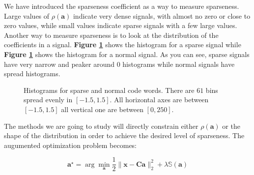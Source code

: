 \documentclass[12pt,a4paper,oneside,english]{UPBThesis}
\begin{document}
We have introduced the sparseness coefficient as a way to measure sparseness. Large values of $\rho(\textbf{a})$ indicate very dense signals, with almost no zero or close to zero values, while small values indicate sparse signals with a few large values. Another way to measure sparseness is to look at the distribution of the coefficients in a signal. \textbf{Figure \ref{fig:CodingMethodsCoeffHists}} shows the histogram for a sparse signal while \textbf{Figure \ref{fig:CodingMethodsCoeffHists}} shows the histogram for a normal signal. As you can see, sparse signals have very narrow and peaker around $0$ histograms while normal signals have spread histograms.

\begin{figure}
\centering
{}
\caption{Histograms for sparse and normal code words. There are $61$ bins spread evenly in $[-1.5,1.5]$. All horizontal axes are between $[-1.5,1.5]$ all vertical one are between $[0,250]$.}
\label{fig:CodingMethodsCoeffHists}
\end{figure}

The methods we are going to study will directly constrain either $\rho(\textbf{a})$ or the shape of the distribution in order to achieve the desired level of sparseness. The augumented optimization problem becomes:

\begin{equation*}
\textbf{a}^{\star} = \arg\min_{\textbf{a}} \frac{1}{2} \| \textbf{x} - \textbf{C}\textbf{a} \|_2^2 + \lambda \mathbb{S}(\textbf{a})
\end{equation*}
\end{document}
